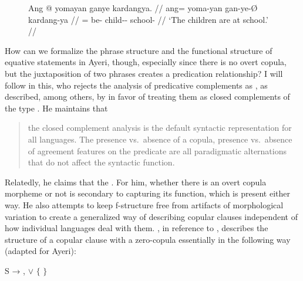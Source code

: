 \begin{figure}
\ex\label{ex:ayrexstmt}\begingl
	\gla Ang @ yomayan ganye kardangya. //
	\glb ang= yoma-yan gan-ye-Ø kardang-ya //
	\glc \AgtT{}= be-\TplM{} child-\Pl{}-\Top{} school-\Loc{} //
	\glft `The children are at school.' //
\endgl\xe
\end{figure}

How can we formalize the phrase structure and the functional structure of
equative statements in Ayeri, though, especially since there is no overt
copula, but the juxtaposition of two phrases creates a predication
relationship? I will follow \citet{attia2008} in this, who rejects the analysis
of predicative complements as \XCompl{}, as described, among others, by
\citet{bresnan2016} in favor of treating them as closed complements of the
\Plink{} type \citep[70]{butt1999}. He maintains that

\blockcquote[105]{attia2008}{the closed complement analysis is the default
syntactic representation for all languages. The presence vs.\ absence of a
copula, presence vs.\ absence of agreement features on the predicate are all
paradigmatic alternations that do not affect the syntactic function.}

Relatedly, he claims that the . For him, whether there is an overt copula morpheme or
not is secondary to capturing its function, which is present either way. He
also attempts to keep f-structure free from artifacts of morphological
variation to create a generalized way of describing copular clauses
independent of how individual languages deal with them. \citet{attia2008}, in
reference to \citet{dalrymple2004}, describes the structure of a copular clause
with a zero-copula essentially in the following way (adapted for Ayeri):

\ex\label{ex:copstruct}
	S → ,  $\lor$ $\Biggl\{$\anno*[%
		\ups{\Pred}~=~%
		\astruct{null-be}{\ups{\Subj} \ups{\Plink}}%
	]{$\epsilon$} $\Biggr\}$
\xe

